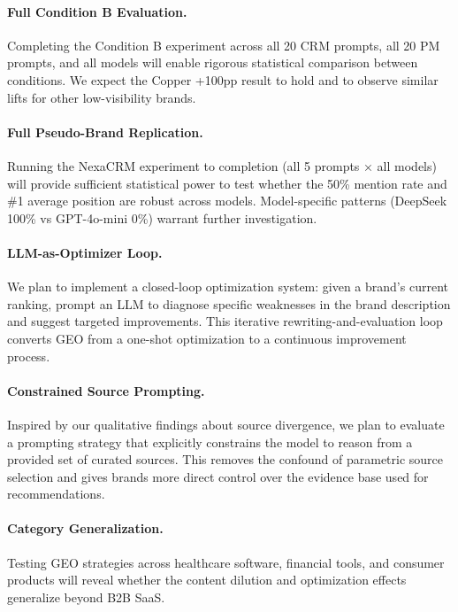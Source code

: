 \documentclass{article}
\begin{document}
\paragraph{Full Condition B Evaluation.}
Completing the Condition B experiment across all 20 CRM prompts, all 20 PM prompts, and all models will enable rigorous statistical comparison between conditions. We expect the Copper +100pp result to hold and to observe similar lifts for other low-visibility brands.

\paragraph{Full Pseudo-Brand Replication.}
Running the NexaCRM experiment to completion (all 5 prompts × all models) will provide sufficient statistical power to test whether the 50\% mention rate and \#1 average position are robust across models. Model-specific patterns (DeepSeek 100\% vs GPT-4o-mini 0\%) warrant further investigation.

\paragraph{LLM-as-Optimizer Loop.}
We plan to implement a closed-loop optimization system: given a brand's current ranking, prompt an LLM to diagnose specific weaknesses in the brand description and suggest targeted improvements. This iterative rewriting-and-evaluation loop converts GEO from a one-shot optimization to a continuous improvement process.

\paragraph{Constrained Source Prompting.}
Inspired by our qualitative findings about source divergence, we plan to evaluate a prompting strategy that explicitly constrains the model to reason from a provided set of curated sources. This removes the confound of parametric source selection and gives brands more direct control over the evidence base used for recommendations.

\paragraph{Category Generalization.}
Testing GEO strategies across healthcare software, financial tools, and consumer products will reveal whether the content dilution and optimization effects generalize beyond B2B SaaS.
\end{document}
